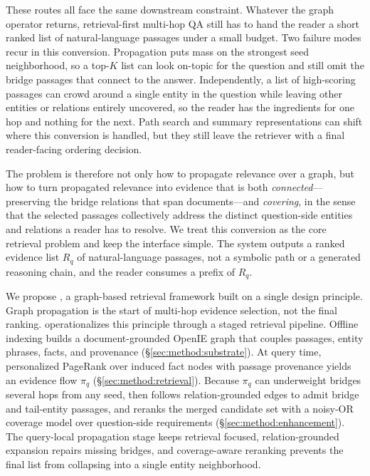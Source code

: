 These routes all face the same downstream constraint. Whatever the
graph operator returns, retrieval-first multi-hop QA still has to hand
the reader a short ranked list of natural-language passages under a
small budget. Two failure modes recur in this conversion. Propagation
puts mass on the strongest seed neighborhood, so a top-$K$ list can
look on-topic for the question and still omit the bridge passages that
connect to the answer. Independently, a list of high-scoring passages
can crowd around a single entity in the question while leaving other
entities or relations entirely uncovered, so the reader has the
ingredients for one hop and nothing for the next. Path search and
summary representations can shift where this conversion is handled, but
they still leave the retriever with a final reader-facing ordering
decision.

The problem is therefore not only how to propagate relevance over a
graph, but how to turn propagated relevance into evidence that is both
\emph{connected}---preserving the bridge relations that span
documents---and \emph{covering}, in the sense that the selected
passages collectively address the distinct question-side entities and
relations a reader has to resolve. We treat this conversion as the core
retrieval problem and keep the interface simple. The system outputs a
ranked evidence list $R_q$ of natural-language passages, not a symbolic
path or a generated reasoning chain, and the reader consumes a prefix
of $R_q$.

We propose \methodname{}, a graph-based retrieval framework built on a
single design principle. Graph propagation is the start of multi-hop
evidence selection, not the final ranking. \methodname{} operationalizes
this principle through a staged retrieval pipeline. Offline indexing
builds a document-grounded OpenIE graph that
couples passages, entity phrases, facts, and provenance
(\S\ref{sec:method:substrate}). At query time, personalized
PageRank over induced fact nodes with passage provenance yields an evidence flow
$\pi_q$ (\S\ref{sec:method:retrieval}). Because $\pi_q$ can underweight
bridges several hops from any seed, \methodname{} then follows
relation-grounded edges to admit bridge and tail-entity passages, and
reranks the merged candidate set with a noisy-OR coverage model over
question-side requirements (\S\ref{sec:method:enhancement}). The
query-local propagation stage keeps retrieval focused,
relation-grounded expansion repairs missing bridges, and coverage-aware
reranking prevents the final list from collapsing into a single entity
neighborhood.

